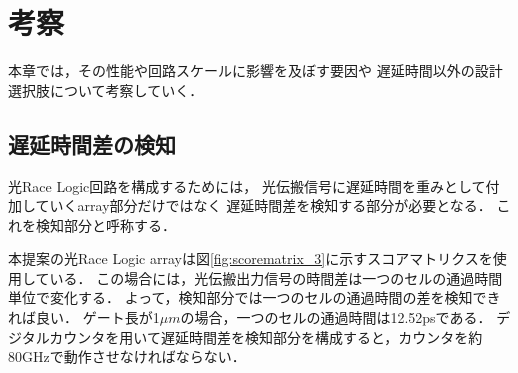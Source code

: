 \chapter{考察}
本章では，その性能や回路スケールに影響を及ぼす要因や
遅延時間以外の設計選択肢について考察していく．
\section{遅延時間差の検知}
光Race Logic回路を構成するためには，
光伝搬信号に遅延時間を重みとして付加していくarray部分だけではなく
遅延時間差を検知する部分が必要となる．
これを検知部分と呼称する．

本提案の光Race Logic arrayは図\ref{fig:scorematrix_3}に示すスコアマトリクスを使用している．
この場合には，光伝搬出力信号の時間差は一つのセルの通過時間単位で変化する．
よって，検知部分では一つのセルの通過時間の差を検知できれば良い．
ゲート長が1$\mu m$の場合，一つのセルの通過時間は12.52psである．
デジタルカウンタを用いて遅延時間差を検知部分を構成すると，カウンタを約80GHzで動作させなければならない．

